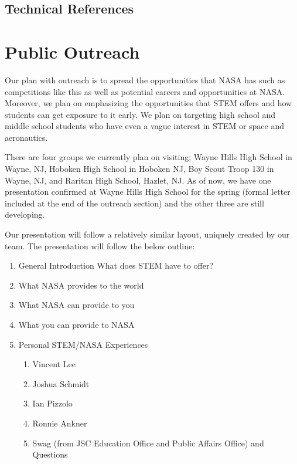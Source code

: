 \documentclass{article}
\let\Oldsection\section
\renewcommand{\section}{\FloatBarrier\Oldsection}
\let\Oldsubsection\subsection
\renewcommand{\subsection}{\FloatBarrier\Oldsubsection}
\begin{document}
\subsection{Technical References}

\printbibliography

\section{Public Outreach}

Our plan with outreach is to spread the opportunities that NASA has such 
as competitions like this as well as potential careers and opportunities 
at NASA. Moreover, we plan on emphasizing the opportunities that STEM 
offers and how students can get exposure to it early. We plan on 
targeting high school and middle school students who have even a vague 
interest in STEM or space and aeronautics.

There are four groups we currently plan on visiting; Wayne Hills High 
School in Wayne, NJ, Hoboken High School in Hoboken NJ, Boy Scout Troop 
130 in Wayne, NJ, and Raritan High School, Hazlet, NJ. As of now, we 
have one presentation confirmed at Wayne Hills High School for the 
spring (formal letter included at the end of the outreach section) and 
the other three are still developing.

Our presentation will follow a relatively similar layout, uniquely 
created by our team. The presentation will follow the below outline:

\begin{enumerate}
\item General Introduction What does STEM have to offer?
\item What NASA provides to the world
\item What NASA can provide to you
\item What you can provide to NASA
\item Personal STEM/NASA Experiences
\begin{enumerate}
\item Vincent Lee
\item Joshua Schmidt
\item Ian Pizzolo
\item Ronnie Ankner
\item Swag (from JSC Education Office and Public Affairs Office) and 
Questions
\end{enumerate}
\end{enumerate}
\end{document}
